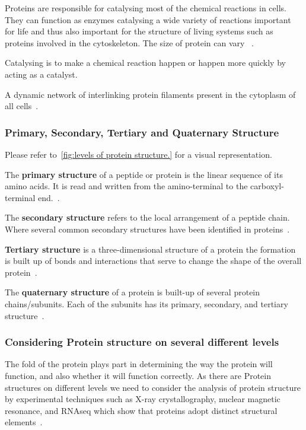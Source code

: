 \documentclass[]{final_report}
\begin{document}
Proteins are responsible for catalysing most of the chemical reactions in cells. They can function as enzymes catalysing a wide variety of reactions important for life and thus also important for the structure of living systems such as proteins involved in the cytoskeleton. The size of protein can vary ~\cite{zvelebil_understanding_2008}.

\begin{definition}[Catalysing]
    Catalysing is to make a chemical reaction happen or happen more quickly by acting as a catalyst.
\end{definition}

\begin{definition}[Cytoskeleton]
    A dynamic network of interlinking protein filaments present in the cytoplasm of all cells~\cite{zvelebil_understanding_2008}. 
\end{definition}

\subsubsection{Primary, Secondary, Tertiary and Quaternary Structure}

Please refer to~\ref{fig:levels of protein structure.} for a visual representation.

The \textbf{primary structure} of a peptide or protein is the linear sequence of its amino acids. It is read and written from the amino-terminal to the carboxyl-terminal end.~\cite{sun_overview_2004}.

The \textbf{secondary structure} refers to the local arrangement of a peptide chain. Where several common secondary structures have been identified in proteins~\cite{sun_overview_2004}.

\textbf{Tertiary structure} is a three-dimensional structure of a protein the formation is built up of bonds and interactions that serve to change the shape of the overall protein~\cite{godbey_chapter_2022}.

The \textbf{quaternary structure} of a protein is built-up of several protein chains/subunits. Each of the subunits has its primary, secondary, and tertiary structure~\cite{ouellette_14_2015}.
\clearpage

\subsubsection{Considering Protein structure on several different levels}

The fold of the protein plays part in determining the way the protein will function, and also whether it will function correctly. As there are Protein structures on different levels we need to consider the analysis of protein structure by experimental techniques such as X-ray crystallography, nuclear magnetic resonance, and RNAseq which show that proteins adopt distinct structural elements~\cite{zvelebil_understanding_2008}.
\vspace{80px}
\end{document}
